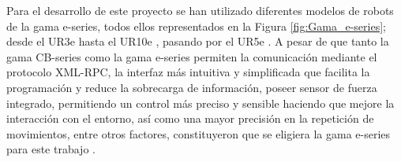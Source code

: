 
Para el desarrollo de este proyecto se han utilizado diferentes modelos de robots de la gama e-series, todos ellos representados en la Figura \ref{fig:Gama_e-series}; desde el UR3e \cite{User_Manual_UR3e_2025} hasta el UR10e \cite{User_Manual_UR10e_2025}, pasando por el UR5e  \cite{User_Manual_UR5e_2025}.
A pesar de que tanto la gama CB-series como la gama e-series permiten la comunicación mediante el protocolo XML-RPC, la interfaz más intuitiva y simplificada que facilita la programación y reduce la sobrecarga de información, poseer sensor de fuerza integrado, permitiendo un control más preciso y sensible haciendo que mejore la interacción con el entorno, así como una mayor precisión en la repetición de movimientos, entre otros factores, constituyeron que se eligiera la gama e-series para este trabajo \cite{Service_Manual_UR_e-series_2024}.

